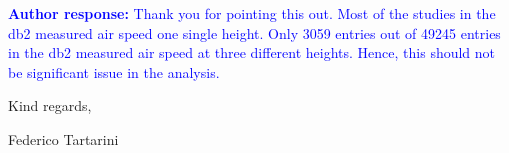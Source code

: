 \documentclass[a4paper, 10pt]{letter}
\newcommand{\response}[1]{\textcolor{blue}{\textbf{Author response:} #1}}
\begin{document}
\begin{letter}
\begin{enumerate}
            \response{
                Thank you for pointing this out.
                Most of the studies in the \ac{db2} measured air speed one single height.
                Only \num{3059} entries out of \num{49245} entries in the \ac{db2} measured air speed at three different heights.
                Hence, this should not be significant issue in the analysis.
            }

        \end{enumerate}

        Kind regards,

        \vspace*{5px}

        Federico Tartarini

    \end{letter}
\end{document}
